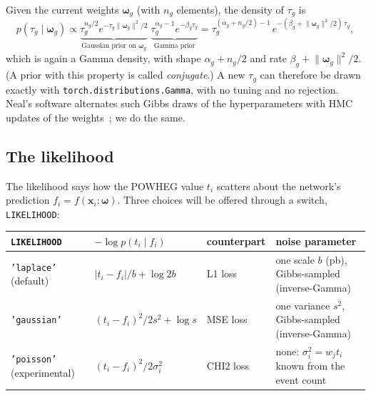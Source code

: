 \documentclass[11pt]{article}
\newcommand{\code}[1]{\texttt{#1}}
\newcommand{\bw}{\boldsymbol{\omega}}
\newcommand{\bx}{\boldsymbol{x}}
\begin{document}
\begin{aside}
Given the current weights $\bw_g$ (with $n_g$ elements), the density of $\tau_g$ is
\[
p(\tau_g \mid \bw_g) \propto
\underbrace{\tau_g^{n_g/2} e^{-\tau_g \lVert\bw_g\rVert^2/2}}_{\text{Gaussian prior on }\bw_g}
\;\underbrace{\tau_g^{\alpha_g - 1} e^{-\beta_g \tau_g}}_{\text{Gamma prior}}
= \tau_g^{(\alpha_g + n_g/2) - 1}\, e^{-(\beta_g + \lVert\bw_g\rVert^2/2)\,\tau_g},
\]
which is again a Gamma density, with shape $\alpha_g + n_g/2$ and rate
$\beta_g + \lVert\bw_g\rVert^2/2$. (A prior with this property is called
\emph{conjugate}.) A new $\tau_g$ can therefore be drawn exactly with
\code{torch.distributions.Gamma}, with no tuning and no rejection. Neal's software
alternates such Gibbs draws of the hyperparameters with HMC updates of the
weights~\cite{neal1996}; we do the same.
\end{aside}

\subsection{The likelihood}
\label{sec:likelihood}

The likelihood says how the POWHEG value $t_i$ scatters about the network's
prediction $f_i = f(\bx_i; \bw)$. Three choices will be offered through a switch,
\code{LIKELIHOOD}:

\begin{center}
\small
\begin{tabular}{lllp{}}
\toprule
\code{LIKELIHOOD} & $-\log p(t_i \mid f_i)$ & counterpart & noise parameter\\
\midrule
\code{'laplace'} (default) & $\lvert t_i - f_i\rvert / b + \log 2b$ & L1 loss
  & one scale $b$ (pb), Gibbs-sampled (inverse-Gamma)\\
\code{'gaussian'} & $(t_i - f_i)^2 / 2s^2 + \log s$ & MSE loss
  & one variance $s^2$, Gibbs-sampled (inverse-Gamma)\\
\code{'poisson'} (experimental) & $(t_i - f_i)^2 / 2\sigma_i^2$ & CHI2 loss
  & none: $\sigma_i^2 = w_j t_i$ known from the event count\\
\bottomrule
\end{tabular}
\end{center}
\end{document}
